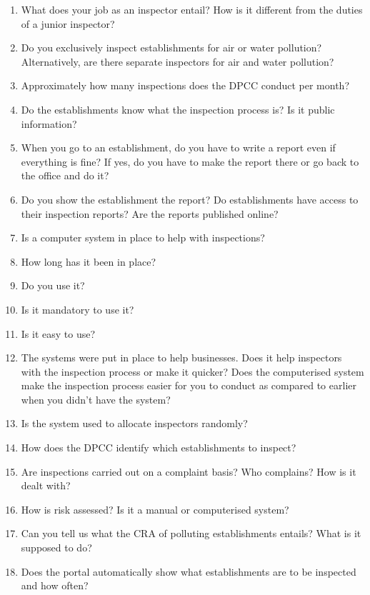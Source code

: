 \documentclass[a4paper, 12pt]{article}
\begin{document}
                    \begin{mdframed}[backgroundcolor=gray!20]
		\begin{enumerate}
		\item{What does your job as an inspector entail? How is it different from the duties of a junior inspector?}
		\item{Do you exclusively inspect establishments for air or water pollution? Alternatively, are there separate inspectors for air and water pollution?}
		\item{Approximately how many inspections does the DPCC conduct per month?}
		\item{Do the establishments know what the inspection process is? Is it public information?}
		\item{When you go to an establishment, do you have to write a report even if everything is fine? If yes, do you have to make the report there or go back to the office and do it?}
		\item{Do you show the establishment the report? Do establishments have access to their inspection reports? Are the reports published online?}
		\item{Is a computer system in place to help with inspections?}
		\item{How long has it been in place?}
		\item{Do you use it? }
		\item{Is it mandatory to use it?} 
		\item{Is it easy to use? }
		\item{The systems were put in place to help businesses. Does it help inspectors with the inspection process or make it quicker? Does the computerised system make the inspection process easier for you to conduct as compared to earlier when you didn’t have the system?}
		\item{Is the system used to allocate inspectors randomly?}
		\item{How does the DPCC identify which establishments to inspect?}
		\item{Are inspections carried out on a complaint basis? Who complains? How is it dealt with?}
		\item{How is risk assessed? Is it a manual or computerised system?}
		\item{Can you tell us what the CRA of polluting establishments entails? What is it supposed to do?}
		\item{Does the portal automatically show what establishments are to be inspected and how often?}

\end{enumerate}
\end{mdframed}
\end{document}
